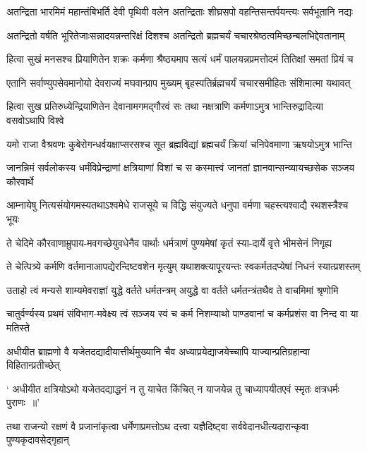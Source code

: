 \twolineshloka
{अतन्द्रिता भारमिमं महान्तंबिभर्ति देवी पृथिवी वलेन}
{अतन्द्रिताः शीघ्रसपो वहन्तिसन्तर्पयन्त्यः सर्वभूतानि नद्यः}


\twolineshloka
{अतन्द्रितो वर्षति भूरितेजाःसन्नादयन्नन्तरिक्षं दिशश्च}
{अतन्द्रितो ब्रह्मचर्यं चचारश्रेष्ठत्वमिच्छन्बलभिद्देवतानाम्}


\twolineshloka
{हित्वा सुखं मनसश्च प्रियाणितेन शक्रः कर्मणा श्रैष्ठ्यमाप}
{सत्यं धर्मं पालयन्नप्रमत्तोदमं तितिक्षां समतां प्रियं च}


\twolineshloka
{एतानि सर्वाण्युपसेवमानोयो देवराज्यं मघवान्प्राप मुख्यम्}
{बृहस्पतिर्ब्रह्मचर्यं चचारसमीहितः संशिमात्मा यथावत्}


\twolineshloka
{हित्वा सुख प्रतिरुध्येन्द्रियाणितेन देवानामगमद्गौरवं सः}
{तथा नक्षत्राणि कर्मणाऽमुत्र भान्तिरुद्रादित्या वसवोऽथापि विश्वे}


\twolineshloka
{यमो राजा वैश्रवणः कुबेरोगन्धर्वयक्षाप्सरसश्च सूत}
{ब्रह्मविद्यां ब्रह्मचर्यं क्रियां चनिपेवमाणा ऋषयोऽमुत्र भान्ति}


\twolineshloka
{जानन्निमं सर्वलोकस्य धर्मंविप्रेन्द्राणां क्षत्रियाणां विशां च}
{स कस्मात्त्वं जानतां ज्ञानवान्सन्व्यायच्छसेक सञ्जय कौरवार्थे}


\twolineshloka
{आम्नायेषु नित्यसंयोगमस्यतथाऽश्वमेधे राजसूये च विद्धि}
{संयुज्यते धनुपा वर्मणा चहस्त्यश्वाद्यै रथशस्त्रैश्च भूयः}


\twolineshloka
{ते चेदिमे कौरवाणाम्रुपाय-मवगच्छेयुवधेनैव पार्थाः}
{धर्मत्राणं पुण्यमेषां कृतं स्या-दार्ये वृत्ते भीमसेनं निगृह्य}


\twolineshloka
{ते चेत्पित्र्ये कर्मणि वर्तमानाआपद्येरन्दिष्टवशेन मृत्युम्}
{यथाशक्त्यापूरयन्तः स्वकर्मतदप्येषां निधनं स्यात्प्रशस्तम्}


\twolineshloka
{उताहो त्वं मन्यसे शाम्यमेवराज्ञां युद्धे वर्तते धर्मतन्त्रम्}
{अयुद्धे वा वर्तते धर्मतन्त्रंतथैव ते वाचमिमां श्रृणोमि}


\twolineshloka
{चातुर्वर्ण्यस्य प्रथमं संविभाग-मवेक्ष्य त्वं सञ्जय स्वं च कर्म}
{निशम्याथो पाण्डवानां च कर्मप्रशंस वा निन्द वा या मतिस्ते}


\twolineshloka
{अधीयीत ब्राह्मणो वै यजेतदद्यादीयात्तीर्थमुख्यानि चैव}
{अध्याप्रयेद्याजयेच्चापि याज्यान्प्रतिग्रहान्वा विहितान्प्रतीच्छेत्}


\twolineshloka
{` अधीयीत क्षत्रियोऽथो यजेतदद्याद्धनं न तु याचेत किंचित्}
{न याजयेन्न तु चाध्यापयीतएवं स्मृतः क्षत्रधर्मः पुराणः ॥'}


\twolineshloka
{तथा राजन्यो रक्षणं वै प्रजानांकृत्वा धर्मेणाप्रमत्तोऽथ दत्त्वा}
{यज्ञैदिष्ट्वा सर्ववेदानधीत्यदारान्कृवा पुण्यकृदावसेद्गृहान्}


